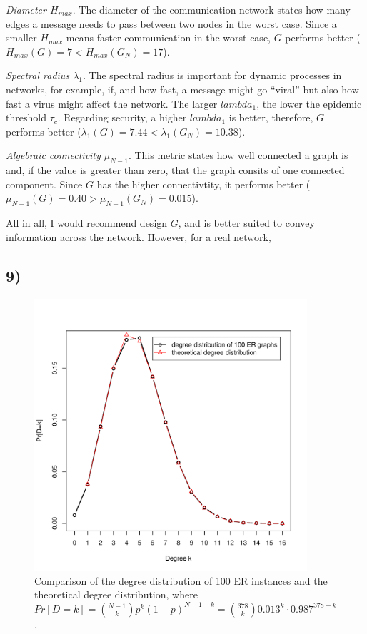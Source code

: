 \documentclass{article}
\begin{document}
\vspace*{0.5em}
\noindent\emph{Diameter $H_{max}$}. The diameter of the communication network
states how many edges a message needs to pass between two nodes in the
worst case. Since a smaller $H_{max}$ means faster communication in
the worst case, $G$ performs better ($H_{max}(G) = 7 < H_{max}(G_N) =
17$).

\vspace*{0.5em}
\noindent\emph{Spectral radius $\lambda_1$}. The spectral radius is important
for dynamic processes in networks, for example, if, and how fast, a
message might go ``viral'' but also how fast a virus might affect the
network. The larger $lambda_1$, the lower the epidemic threshold
$\tau_c$. Regarding security, a higher $lambda_1$ is better,
therefore, $G$ performs better ($\lambda_1(G) = 7.44 < \lambda_1(G_N)
= 10.38$).

\vspace*{0.5em}
\noindent\emph{Algebraic connectivity $\mu_{N-1}$}. This metric states how well connected a graph is
and, if the value is greater than zero, that the graph consits of one
connected component. Since $G$ has the higher connectivtity, it
performs better ($\mu_{N-1}(G) = 0.40 > \mu_{N-1}(G_N) = 0.015$).

\vspace*{0.5em}
\noindent All in all, I would recommend design $G$, and is better
suited to convey information across the network. However, for a real
network, 

\subsection*{9)}

\begin{figure}[H]
  \centering
  \includegraphics[width=0.9\textwidth]{er_degree_distribution}
  \caption{Comparison of the degree distribution of 100 ER instances
    and the theoretical degree distribution, where $Pr[D=k] =
    \binom{N-1}{k}p^k(1-p)^{N-1-k}=\binom{378}{k}0.013^k\cdot0.987^{378-k}$.}
\end{figure}
\end{document}

